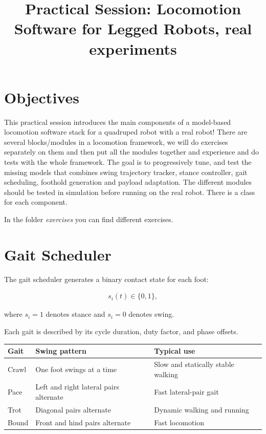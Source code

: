 \documentclass[11pt,a4paper]{article}
\title{\textbf{Practical Session: Locomotion Software for Legged Robots, real experiments}}
\author{}
\date{}
\begin{document}
\maketitle

\section{Objectives}


This practical session introduces the main components of a model-based locomotion software stack for a quadruped robot with a real robot! 
There are several blocks/modules  in a locomotion framework, we will do exercises separately on  them and then put all the modules together and experience and do tests with the whole framework.
The goal is to progressively tune, and test the missing models that  combines swing trajectory tracker, stance controller, gait scheduling,  foothold generation and payload adaptation. The different modules should be tested in simulation before running on the real robot. There is a class for each component. 

In the folder \textit{exercises}  you can find different  exercises. 

\section{Gait Scheduler}

The gait scheduler generates a binary contact state for each foot:

\begin{align*}
	s_i(t) \in \{0,1\},
\end{align*}

where \(s_i=1\) denotes stance and \(s_i=0\) denotes swing.

Each gait is described by its cycle duration, duty factor, and phase offsets.

\begin{table}[h]
	\centering
	\begin{tabular}{lll}
		\toprule
		Gait & Swing pattern & Typical use \\
		\midrule
		Crawl & One foot swings at a time & Slow and statically stable walking \\
		Pace & Left and right lateral pairs alternate & Fast lateral-pair gait \\
		Trot & Diagonal pairs alternate & Dynamic walking and running \\
		Bound & Front and hind pairs alternate & Fast locomotion \\
		\bottomrule
	\end{tabular}
\end{table}
\end{document}

